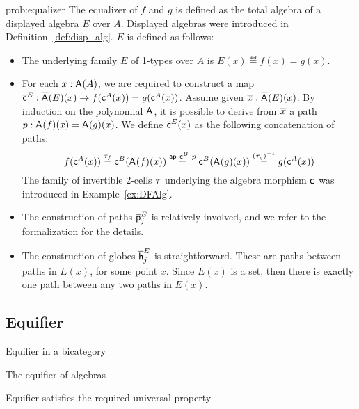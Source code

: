 \begin{construction}{prob:equalizer}\label{cons:equalizer}
The equalizer of $f$ and $g$ is defined as the total algebra of a
displayed algebra $E$ over $A$. Displayed algebras were
introduced in Definition~\ref{def:disp_alg}. $E$ is defined as follows:
\begin{itemize}
\item The underlying family $E$ of 1-types over $A$ is $E(x) \eqdef f(x) = g(x)$.
\item
For each $x : \mathsf{A}^{}(A)$, we are required to construct
a map $\overline{\mathsf{c}}^{E} : \overline{\mathsf{A}^{}}(E)(x) \rightarrow
f(\mathsf{c}^{A}(x)) = g (\mathsf{c}^{A}(x))$. Assume given $\overline{x}
: \overline{\mathsf{A}^{}}(E)(x)$. By induction on the polynomial
$\mathsf{A}^{}$, it is possible to derive from $\overline{x}$ a path $p
: \mathsf{A}^{}(f)(x) = \mathsf{A}^{}(g)(x)$.  We
define $\overline{\mathsf{c}}^{E}(\overline{x})$ as the following concatenation of paths:
\[
f(\mathsf{c}^{A}(x))
\stackrel{\tau_f}{=} \mathsf{c}^{B}(\mathsf{A}^{}(f)(x))
\stackrel{\mathsf{ap} \ \mathsf{c}^{B} \ p}{=} \mathsf{c}^{B}(\mathsf{A}^{}(g)(x))
\stackrel{(\tau_g)^{-1}}{=} g (\mathsf{c}^{A}(x))
\]
The family of invertible 2-cells $\tau$ underlying the algebra
morphism $\mathsf{c}^{}$ was introduced in Example~\ref{ex:DFAlg}.
\item The construction of paths $\overline{\mathsf{p}}^{E}_{j}$ is relatively involved, and we refer to the formalization for the details.
\item
The construction of globes $\overline{\mathsf{h}}^{E}_{j}$ is
straightforward. These are paths between paths in $E(x)$, for some
point $x$. Since $E(x)$ is a set, then there is exactly one path
between any two paths in $E(x)$.
\end{itemize}
\end{construction}

\subsection{Equifier}

\begin{definition}
Equifier in a bicategory
\end{definition}

\begin{definition}
The equifier of algebras
\end{definition}

\begin{proposition}
Equifier satisfies the required universal property
\end{proposition}
